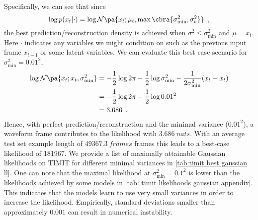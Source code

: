 {Specifically, we can see that since
\begin{equation}
    \log p(x_t|\cdot) = \log \mathcal{N}\pa{x_t; \mu_t, \max\cbra{\sigma_\text{min}^2, \sigma_t^2}}\enspace \label{eq: gaussian ll with minimum variance} ,
\end{equation}
the best prediction/reconstruction density is achieved when $\sigma^2 \leq \sigma_\text{min}^2$ and $\mu=x_t$. 
Here $\cdot$ indicates any variables we might condition on such as the previous input frame $x_{t-1}$ or some latent variables.
We can evaluate this best case scenario for $\sigma_\text{min}^2 = 0.01^2$,
\begin{align}
    \log \mathcal{N}\pa{x_t; x_t, \sigma_\text{min}^2} &= -\frac{1}{2}\log 2\pi - \frac{1}{2}\log \sigma_\text{min}^2 - \frac{1}{2\sigma_\text{min}^2} (x_t - x_t) \nonumber \\
    &= -\frac{1}{2}\log 2\pi - \frac{1}{2}\log 0.01^2 \nonumber \\
    &= 3.686 \enspace . 
\end{align}
Hence, with perfect prediction/reconstruction and the minimal variance ($0.01^2$), a waveform frame contributes to the likelihood with $\SI{3.686}{nats}$. With an average test set example length of $\SI{49367.3}{frames}$ frames this leads to a best-case likelihood of 181967. We provide a list of maximally attainable Gaussian likelihoods on TIMIT for different minimal variances in \cref{tab:timit best gaussian ll}. One can note that the maximal likelihood at $\sigma_\text{min}^2=0.1^2$ is lower than the likelihoods achieved by some models in \cref{tab: timit likelihoods gaussian appendix}. This indicates that the models learn to use very small variances in order to increase the likelihood. Empirically, standard deviations smaller than approximately $0.001$ can result in numerical instability.


}
